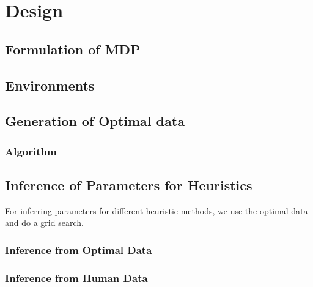 \section{Design}
\label{design}


\subsection{Formulation of MDP}

\subsection{Environments}



\subsection{Generation of Optimal data}

\subsubsection{Algorithm}



\subsection{Inference of Parameters for Heuristics}
For inferring parameters for different heuristic methods, we use the optimal data and do a grid search. 


\subsubsection{Inference from Optimal Data}

\subsubsection{Inference from Human Data}


